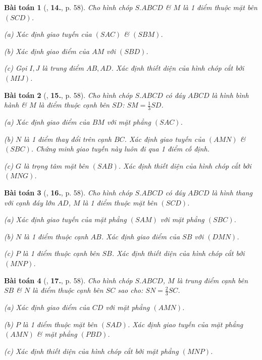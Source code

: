 \documentclass{article}
\numberwithin{equation}{section}
\newtheorem{baitoan}{Bài toán}[section]
\begin{document}
\begin{baitoan}[\cite{TL_chuyen_Toan_Hinh_Hoc_11}, \textbf{14.}, p. 58]
	Cho hình chóp $S.ABCD$ \& $M$ là 1 điểm thuộc mặt bên $(SCD)$.
	\begin{enumerate*}
		\item[(a)] Xác định giao tuyến của $(SAC)$ \& $(SBM)$.
		\item[(b)] Xác định giao điểm của $AM$ với $(SBD)$.
		\item[(c)] Gọi $I,J$ là trung điểm $AB,AD$. Xác định thiết diện của hình chóp cắt bởi $(MIJ)$.
	\end{enumerate*}
\end{baitoan}

\begin{baitoan}[\cite{TL_chuyen_Toan_Hinh_Hoc_11}, \textbf{15.}, p. 58]
	Cho hình chóp $S.ABCD$ có đáy $ABCD$ là hình bình hành \& $M$ là điểm thuộc cạnh bên $SD$: $SM = \frac{1}{3}SD$.
	\begin{enumerate*}
		\item[(a)] Xác định giao điểm của $BM$ với mặt phẳng $(SAC)$.
		\item[(b)] $N$ là 1 điểm thay đổi trên cạnh $BC$. Xác định giao tuyến của $(AMN)$ \& $(SBC)$. Chứng minh giao tuyến này luôn đi qua 1 điểm cố định.
		\item[(c)] $G$ là trọng tâm mặt bên $(SAB)$. Xác định thiết diện của hình chóp cắt bởi $(MNG)$.
	\end{enumerate*}
\end{baitoan}

\begin{baitoan}[\cite{TL_chuyen_Toan_Hinh_Hoc_11}, \textbf{16.}, p. 58]
	Cho hình chóp $S.ABCD$ có đáy $ABCD$ là hình thang với cạnh đáy lớn $AD$, $M$ là 1 điểm thuộc mặt bên $(SCD)$.
	\begin{enumerate*}
		\item[(a)] Xác định giao tuyến của mặt phẳng $(SAM)$ với mặt phẳng $(SBC)$.
		\item[(b)] $N$ là 1 điểm thuộc cạnh $AB$. Xác định giao điểm của $SB$ với $(DMN)$.
		\item[(c)] $P$ là 1 điểm thuộc cạnh bên $SB$. Xác định thiết diện của hình chóp cắt bởi $(MNP)$.
	\end{enumerate*}
\end{baitoan}

\begin{baitoan}[\cite{TL_chuyen_Toan_Hinh_Hoc_11}, \textbf{17.}, p. 58]
	Cho hình chóp $S.ABCD$, $M$ là trung điểm cạnh bên $SB$ \& $N$ là điểm thuộc cạnh bên $SC$ sao cho: $SN = \frac{2}{3}SC$.
	\begin{enumerate*}
		\item[(a)] Xác định giao điểm của $CD$ với mặt phẳng $(AMN)$.
		\item[(b)] $P$ là 1 điểm thuộc mặt bên $(SAD)$. Xác định giao tuyến của mặt phẳng $(AMN)$ \& mặt phẳng $(PBD)$.
		\item[(c)] Xác định thiết diện của hình chóp cắt bởi mặt phẳng $(MNP)$.
	\end{enumerate*}
\end{baitoan}
\end{document}
